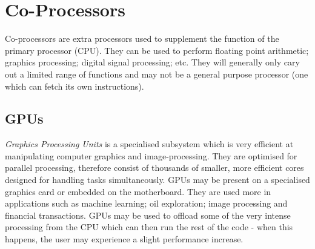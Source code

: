 \documentclass[a4paper,11pt, twocolumn]{article}
\begin{document}
\section{Co-Processors}
Co-processors are extra processors used to supplement the function of the primary processor (CPU). They can be used to perform floating point arithmetic; graphics processing; digital signal processing; etc. They will generally only cary out a limited range of functions and may not be a general purpose processor (one which can fetch its own instructions).
\subsection{GPUs}
\textit{Graphics Processing Units} is a specialised subsystem which is very efficient at manipulating computer graphics and image-processing. They are optimised for parallel processing, therefore consist of thousands of smaller, more efficient cores designed for handling tasks simultaneously. GPUs may be present on a specialised graphics card or embedded on the motherboard. They are used more in applications such as machine learning; oil exploration; image processing and financial transactions. GPUs may be used to offload some of the very intense processing from the CPU which can then run the rest of the code - when this happens, the user may experience a slight performance increase.
\end{document}
